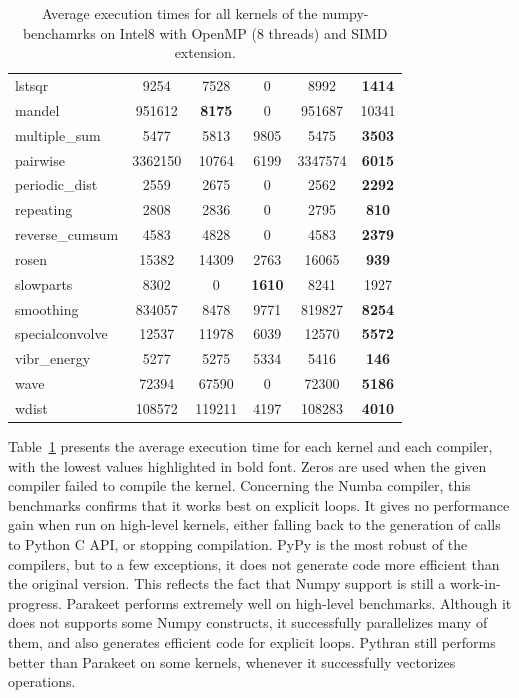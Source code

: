 \documentclass[10pt, preprint]{sigplanconf}
\begin{document}
\begin{table}[t]
{\begin{tabular}{|l||c|c|c|c|c|}
                      lstsqr &    9254 &          7528 &             0 &    8992 & \textbf{1414} \\
                      mandel &  951612 & \textbf{8175} &             0 &  951687 &         10341 \\
               multiple\_sum &    5477 &          5813 &          9805 &    5475 & \textbf{3503} \\
                    pairwise & 3362150 &         10764 &          6199 & 3347574 & \textbf{6015} \\
              periodic\_dist &    2559 &          2675 &             0 &    2562 & \textbf{2292} \\
                   repeating &    2808 &          2836 &             0 &    2795 &  \textbf{810} \\
             reverse\_cumsum &    4583 &          4828 &             0 &    4583 & \textbf{2379} \\
                       rosen &   15382 &         14309 &          2763 &   16065 &  \textbf{939} \\
                   slowparts &    8302 &             0 & \textbf{1610} &    8241 &          1927 \\
                   smoothing &  834057 &          8478 &          9771 &  819827 & \textbf{8254} \\
             specialconvolve &   12537 &         11978 &          6039 &   12570 & \textbf{5572} \\
                vibr\_energy &    5277 &          5275 &          5334 &    5416 &  \textbf{146} \\
                        wave &   72394 &         67590 &             0 &   72300 & \textbf{5186} \\
                       wdist &  108572 &        119211 &          4197 &  108283 & \textbf{4010} \\
\hline
\end{tabular}
}
\caption{Average execution times for all kernels of the numpy-benchamrks on Intel8 with OpenMP (8 threads) and SIMD extension.}
\label{tbl:overview}
\end{table}

Table~\ref{tbl:overview} presents the average execution time for each kernel
and each compiler, with the lowest values highlighted in
bold font. Zeros are used when the given compiler failed to
compile the kernel. Concerning the Numba compiler, this
benchmarks confirms that it works best on explicit loops. It
gives no performance gain when run on high-level kernels,
either falling back to the generation of calls to Python C
API, or stopping compilation. PyPy is the most robust of
the compilers, but to a few exceptions, it does not generate
code more efficient than the original version. This reflects
the fact that Numpy support is still a work-in-progress.
Parakeet performs extremely well on high-level benchmarks.
Although it does not supports some Numpy constructs, it
successfully parallelizes many of them, and also generates
efficient code for explicit loops. Pythran still performs better
than Parakeet on some kernels, whenever it successfully
vectorizes operations.
\end{document}
